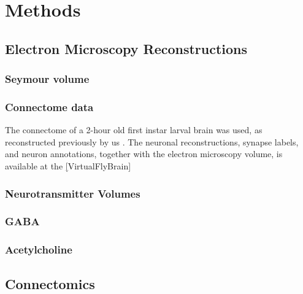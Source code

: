 
\chapter{Methods}


\section{Electron Microscopy Reconstructions}
    \subsection{Seymour volume}
    \subsection{Connectome data}
    The connectome of a 2-hour old first instar larval brain was used, as reconstructed previously by us \citep{winding2023connectome}. The neuronal reconstructions, synapse labels, and neuron annotations, together with the electron microscopy volume, is available at the \href{https://l1em.catmaid.virtualflybrain.org/?pid=1&zp=108250&yp=82961.59999999999&xp=54210.799999999996&tool=tracingtool&sid0=1&s0=2.4999999999999996&help=true&layout=h(XY,%20%7B%20type:%20%22neuron-search%22,%20id:%20%22neuron-search-1%22,%20options:%20%7B%22annotation-name%22:%20%22papers%22%7D%7D,%200.6)}[VirtualFlyBrain]
    \subsection{Neurotransmitter Volumes}
    \subsection*{GABA}
    \subsection*{Acetylcholine}

\section{Connectomics}
